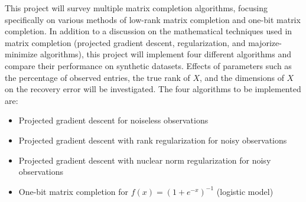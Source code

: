 This project will survey multiple matrix completion algorithms, focusing specifically on various methods of low-rank matrix completion and one-bit matrix completion. In addition to a discussion on the mathematical techniques used in matrix completion (projected gradient descent, regularization, and majorize-minimize algorithms), this project will implement four different algorithms and compare their performance on synthetic datasets. Effects of parameters such as the percentage of observed entries, the true rank of $X$, and the dimensions of $X$ on the recovery error will be investigated. The four algorithms to be implemented are:

\begin{itemize}
    \item Projected gradient descent for noiseless observations
    \item Projected gradient descent with rank regularization for noisy observations
    \item Projected gradient descent with nuclear norm regularization for noisy observations
    \item One-bit matrix completion for $f(x) = (1 + e^{-x})^{-1}$ (logistic model)
\end{itemize}